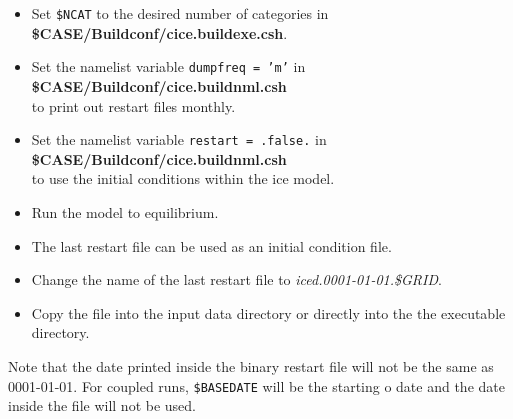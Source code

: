 \begin{itemize}
  \item Set {\tt \$NCAT} to the desired number of categories in \\
        {\bf \$CASE/Buildconf/cice.buildexe.csh}.
  \item Set the namelist variable {\tt dumpfreq = 'm'} in \\
        {\bf \$CASE/Buildconf/cice.buildnml.csh} \\
        to print out restart files monthly.
  \item Set the namelist variable {\tt restart = .false.} in 
        {\bf \$CASE/Buildconf/cice.buildnml.csh} \\
        to use the initial conditions within the ice model.
  \item Run the model to equilibrium. 
  \item The last restart file can be used as an initial condition file.
  \item Change the name of the last restart file to {\it iced.0001-01-01.\$GRID}.
  \item Copy the file into the input data directory or directly into the 
        the executable directory.
\end{itemize}

Note that the date printed inside the binary restart file will not be the 
same as 0001-01-01.  For coupled runs, {\tt \$BASEDATE} will be the starting o
date and the date inside the file will not be used.  

